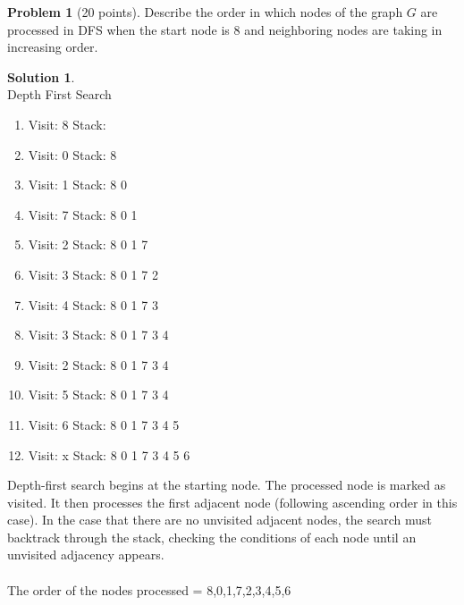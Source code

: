 \documentclass{article}
\theoremstyle{definition}
\newtheorem{problem}{Problem}
\newtheorem*{solution}{Solution}
\begin{document}
\newpage

\begin{problem}[20 points]
Describe the order in which nodes of the graph $G$ are processed in
DFS when the start node is 8 and neighboring nodes are taking in
increasing order. 
\end{problem}
\begin{solution} \\
Depth First Search\\
\begin{enumerate}
    \item Visit: 8 Stack:
    \item Visit: 0 Stack: 8 
    \item Visit: 1 Stack: 8 0
    \item Visit: 7 Stack: 8 0 1
    \item Visit: 2 Stack: 8 0 1 7
    \item Visit: 3 Stack: 8 0 1 7 2
    \item Visit: 4 Stack: 8 0 1 7 3
    \item Visit: 3 Stack: 8 0 1 7 3 4
    \item Visit: 2 Stack: 8 0 1 7 3 4
    \item Visit: 5 Stack: 8 0 1 7 3 4
    \item Visit: 6 Stack: 8 0 1 7 3 4 5
    \item Visit: x Stack: 8 0 1 7 3 4 5 6
\end{enumerate}
Depth-first search begins at the starting node. The processed node is marked as visited. It then processes the first adjacent node (following ascending order in this case). In the case that there are no unvisited adjacent nodes, the search must backtrack through the stack, checking the conditions of each node until an unvisited adjacency appears.
\\
\\
The order of the nodes processed = 8,0,1,7,2,3,4,5,6\\
\end{solution}




\medskip



\goodbreak
\checklist
\end{document}
